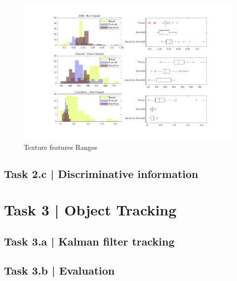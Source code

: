\documentclass[conference]{IEEEtran}
\begin{document}
\begin{figure}[htbp]
    \centering
    \includegraphics[width=\columnwidth]{figures/ranges.pdf}
    \caption{Texture features Ranges\label{fig:tex_feats_ranges}}
\end{figure}


\subsection*{Task 2.c | Discriminative information}

\section*{Task 3 | Object Tracking}

\subsection*{Task 3.a | Kalman filter tracking}

\subsection*{Task 3.b | Evaluation}


\appendix
\end{document}
